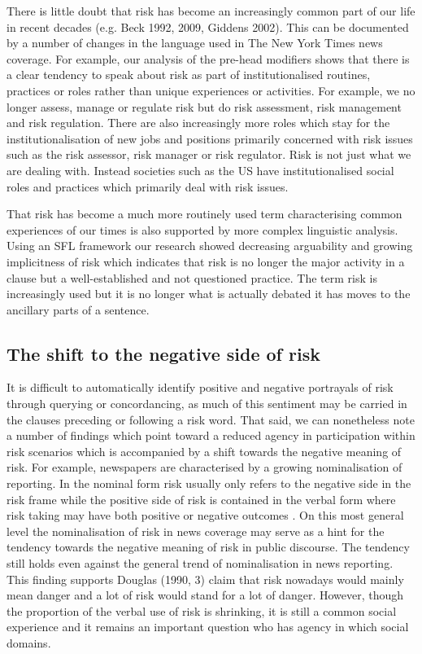 There is little doubt that risk has become an increasingly common part of our life in recent decades (e.g. Beck 1992, 2009, Giddens 2002). This can be documented by a number of changes in the language used in The New York Times news coverage. For example, our analysis of the pre-head modifiers shows that there is a clear tendency to speak about risk as part of institutionalised routines, practices or roles rather than unique experiences or activities. For example, we no longer assess, manage or regulate risk but do risk assessment, risk management and risk regulation. There are also increasingly more roles which stay for the institutionalisation of new jobs and positions primarily concerned with risk issues such as the risk assessor, risk manager or risk regulator. Risk is not just what we are dealing with. Instead societies such as the US have institutionalised social roles and practices which primarily deal with risk issues.

That risk has become a much more routinely used term characterising common experiences of our times is also supported by more complex linguistic analysis. Using an SFL framework our research showed decreasing arguability and growing implicitness of risk which indicates that risk is no longer the major activity in a clause but a well-established and not questioned practice. The term risk is increasingly used but it is no longer what is actually debated it has moves to the ancillary parts of a sentence.  

\subsection*{The shift to the negative side of risk}

It is difficult to automatically identify positive and negative portrayals of risk through querying or concordancing, as much of this sentiment may be carried in the clauses preceding or following a risk word. That said, we can nonetheless note a number of findings which point toward a reduced agency in participation within risk scenarios which is accompanied by a shift towards the negative meaning of risk. For example, newspapers are characterised by a growing nominalisation of reporting. In the nominal form risk usually only refers to the negative side in the risk frame while the positive side of risk is contained in the verbal form where risk taking may have both positive or negative outcomes \cite{fillmore_toward_1992}. On this most general level the nominalisation of risk in news coverage may serve as a hint for the tendency towards the negative meaning of risk in public discourse. The tendency still holds even against the general trend of nominalisation in news reporting. This finding supports Douglas (1990, 3) claim that risk nowadays would mainly mean danger and a lot of risk would stand for a lot of danger. However, though the proportion of the verbal use of risk is shrinking, it is still a common social experience and it remains an important question who has agency in which social domains. 

